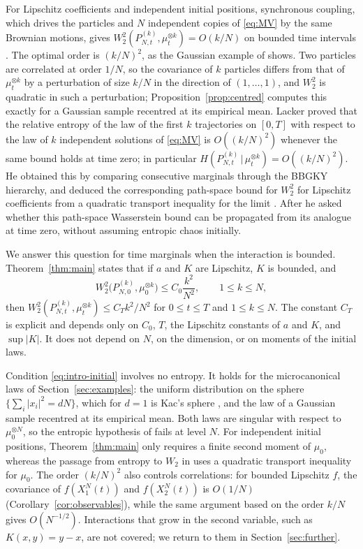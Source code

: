 \documentclass[11pt]{amsart}
\numberwithin{equation}{section}
\theoremstyle{plain}
\theoremstyle{remark}
\newcommand{\W}{W_2}
\begin{document}
For Lipschitz coefficients and independent initial positions, synchronous coupling, which drives the particles and $N$ independent copies of \eqref{eq:MV} by the same Brownian motions, gives $\W^2(P^{(k)}_{N,t},\mu_t^{\otimes k})=O(k/N)$ on bounded time intervals \cite{Szn91}. The optimal order is $(k/N)^2$, as the Gaussian example of \cite[Example~2.8]{Lac23} shows. Two particles are correlated at order $1/N$, so the covariance of $k$ particles differs from that of $\mu_t^{\otimes k}$ by a perturbation of size $k/N$ in the direction of $(1,\dots,1)$, and $\W^2$ is quadratic in such a perturbation; Proposition~\ref{prop:centred} computes this exactly for a Gaussian sample recentred at its empirical mean. Lacker \cite{Lac23} proved that the relative entropy of the law of the first $k$ trajectories on $[0,T]$ with respect to the law of $k$ independent solutions of \eqref{eq:MV} is $O((k/N)^2)$ whenever the same bound holds at time zero; in particular $H(P^{(k)}_{N,t}\,|\,\mu_t^{\otimes k})=O((k/N)^2)$. He obtained this by comparing consecutive marginals through the BBGKY hierarchy, and deduced the corresponding path-space bound for $\W^2$ for Lipschitz coefficients from a quadratic transport inequality for the limit \cite{Tal96,OV00,GL10}. After \cite[Corollary~2.7]{Lac23} he asked whether this path-space Wasserstein bound can be propagated from its analogue at time zero, without assuming entropic chaos initially.

We answer this question for time marginals when the interaction is bounded. Theorem~\ref{thm:main} states that if $a$ and $K$ are Lipschitz, $K$ is bounded, and
\begin{equation}\label{eq:intro-initial}
\W^2\big(P^{(k)}_{N,0},\mu_0^{\otimes k}\big)\le C_0\frac{k^2}{N^2},\qquad 1\le k\le N,
\end{equation}
then $\W^2(P^{(k)}_{N,t},\mu_t^{\otimes k})\le C_Tk^2/N^2$ for $0\le t\le T$ and $1\le k\le N$. The constant $C_T$ is explicit and depends only on $C_0$, $T$, the Lipschitz constants of $a$ and $K$, and $\sup|K|$. It does not depend on $N$, on the dimension, or on moments of the initial laws.

Condition \eqref{eq:intro-initial} involves no entropy. It holds for the microcanonical laws of Section~\ref{sec:examples}: the uniform distribution on the sphere $\{\sum_i|x_i|^2=dN\}$, which for $d=1$ is Kac's sphere \cite{Kac56}, and the law of a Gaussian sample recentred at its empirical mean. Both laws are singular with respect to $\mu_0^{\otimes N}$, so the entropic hypothesis of \cite{Lac23} fails at level $N$. For independent initial positions, Theorem~\ref{thm:main} only requires a finite second moment of $\mu_0$, whereas the passage from entropy to $\W$ in \cite[Corollary~2.7]{Lac23} uses a quadratic transport inequality for $\mu_0$. The order $(k/N)^2$ also controls correlations: for bounded Lipschitz $f$, the covariance of $f(X^N_1(t))$ and $f(X^N_2(t))$ is $O(1/N)$ (Corollary~\ref{cor:observables}), while the same argument based on the order $k/N$ gives $O(N^{-1/2})$. Interactions that grow in the second variable, such as $K(x,y)=y-x$, are not covered; we return to them in Section~\ref{sec:further}.
\end{document}
